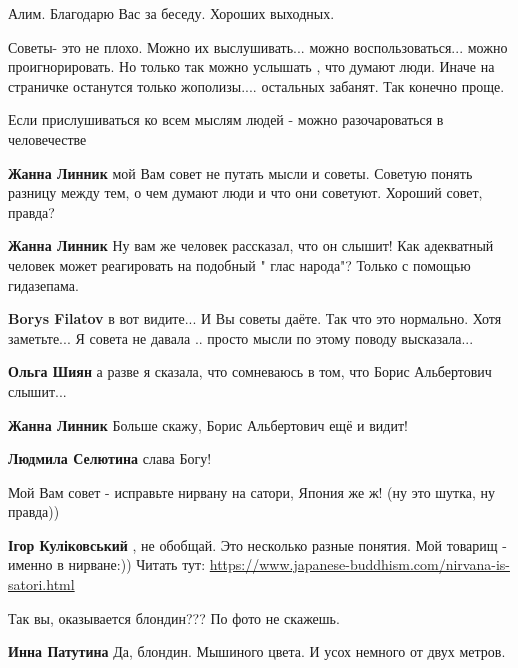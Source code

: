 \begin{itemize}
\begin{itemize}
Алим. Благодарю Вас за беседу. Хороших выходных.

\end{itemize} %


Советы- это не плохо. Можно их выслушивать... можно воспользоваться... можно
проигнорировать. Но только так можно услышать , что думают люди. Иначе на
страничке останутся только жополизы.... остальных забанят. Так конечно проще.

\begin{itemize} %
Если прислушиваться ко всем мыслям людей - можно разочароваться в человечестве


\textbf{Жанна Линник} мой Вам совет не путать мысли и советы. Советую понять разницу между тем, о чем думают люди и что они советуют.
Хороший совет, правда?

\textbf{Жанна Линник} Ну вам же человек рассказал, что он слышит! Как адекватный человек может реагировать на подобный " глас народа"? Только с помощью гидазепама.

\textbf{Borys Filatov} в вот видите... И Вы советы даёте. Так что это нормально. Хотя заметьте... Я совета не давала .. просто мысли по этому поводу высказала...

\textbf{Ольга Шиян} а разве я сказала, что сомневаюсь в том, что Борис Альбертович слышит...

\textbf{Жанна Линник} Больше скажу, Борис Альбертович ещё и видит!

\textbf{Людмила Селютина} слава Богу!
\end{itemize} %

Мой Вам совет - исправьте нирвану на сатори, Япония же ж!
(ну это шутка, ну правда))

\begin{itemize} %
\textbf{Ігор Куліковський} , не обобщай.
Это несколько разные понятия. Мой товарищ - именно в нирване:))
Читать тут:
\url{https://www.japanese-buddhism.com/nirvana-is-satori.html}
\end{itemize} %

Так вы, оказывается блондин??? По фото не скажешь.

\begin{itemize} %
\textbf{Инна Патутина} Да, блондин. Мышиного цвета.
И усох немного от двух метров.


\end{itemize}
\end{itemize}
